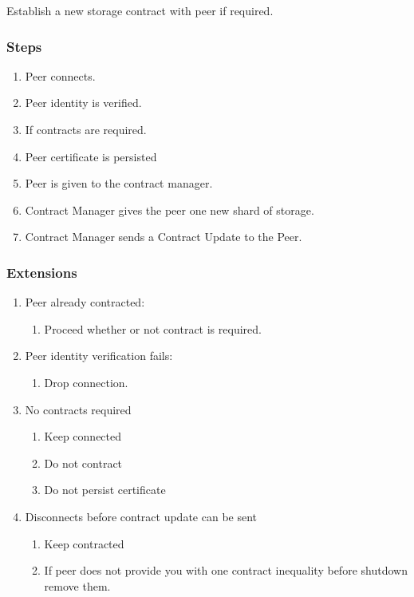 \documentclass[11pt, a4paper, twocolumn, twoside]{report}
\begin{document}
Establish a new storage contract with peer if required.

\subsubsection{Steps}

\begin{enumerate}
 \item Peer connects.
 \item Peer identity is verified.
 \item If contracts are required.
 \item Peer certificate is persisted
 \item Peer is given to the contract manager.
 \item Contract Manager gives the peer one new shard of storage.
 \item Contract Manager sends a Contract Update to the Peer.
\end{enumerate}

\subsubsection{Extensions}
\begin{enumerate}
  \item Peer already contracted:
	\begin{enumerate}
	  \item Proceed whether or not contract is required.
	\end{enumerate}
  \item Peer identity verification fails:
	\begin{enumerate}
	  \item Drop connection.
	\end{enumerate}
  \item No contracts required
	\begin{enumerate}
	  \item Keep connected
	  \item Do not contract
	  \item Do not persist certificate
	\end{enumerate}
  \item Disconnects before contract update can be sent
	\begin{enumerate}
	  \item Keep contracted
	  \item If peer does not provide you with one contract inequality before shutdown remove them.
	\end{enumerate}
\end{enumerate}
\end{document}
